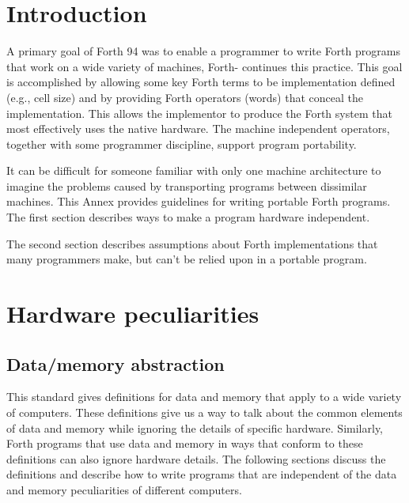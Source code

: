 
\label{annex:port}

\section{Introduction} %
\label{port:intro}

A primary goal of Forth 94 was to enable a programmer to write Forth
programs that work on a wide variety of machines, Forth-\snapshot{}
continues this practice.  This goal is accomplished by allowing some
key Forth terms to be implementation defined (e.g., cell size) and
by providing Forth operators (words) that conceal the implementation.
This allows the implementor to produce the Forth system that most
effectively uses the native hardware. The machine independent
operators, together with some programmer discipline, support program
portability.

It can be difficult for someone familiar with only one machine
architecture to imagine the problems caused by transporting programs
between dissimilar machines.
This Annex provides guidelines for writing portable Forth programs.
The first section describes ways to make a program hardware independent.

The second section describes assumptions about Forth implementations
that many programmers make, but can't be relied upon in a portable program.


\section{Hardware peculiarities} %
\label{port:hardware}

\subsection{Data/memory abstraction} %

This standard gives definitions for data and memory that
apply to a wide variety of computers. These definitions give us a way
to talk about the common elements of data and memory while ignoring
the details of specific hardware. Similarly, Forth programs that
use data and memory in ways that conform to these definitions can
also ignore hardware details. The following sections discuss the
definitions and describe how to write programs that are independent
of the data and memory peculiarities of different computers.

